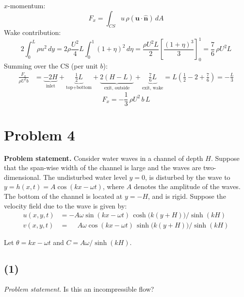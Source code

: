 \documentclass[11pt]{article}
\newcommand{\vect}[1]{\mathbf{#1}}
\begin{document}
\medskip
\noindent $x$-momentum:
\begin{equation*}
F_x = \int_{CS} u\,\rho(\vect u\cdot\hat{\vect n})\,dA
\end{equation*}
Wake contribution:
\begin{equation*}
2\int_0^L \rho u^2\,dy = 2\rho\frac{U^2}{4}L\int_0^1 (1+\eta)^2\,d\eta
= \frac{\rho U^2 L}{2}\left[\frac{(1+\eta)^3}{3}\right]_0^1 = \frac76\,\rho U^2 L
\end{equation*}
Summing over the CS (per unit $b$):
\begin{align*}
\frac{F_x}{\rho U^2 b} &= \underbrace{-2H}_{\text{inlet}} + \underbrace{\frac12 L}_{\text{top+bottom}}
 + \underbrace{2(H - L)}_{\text{exit, outside}} + \underbrace{\frac76 L}_{\text{exit, wake}}
 = L\left(\frac12 - 2 + \frac76\right) = -\frac{L}{3}
\end{align*}
\begin{equation*}
\boxed{F_x = -\frac13\,\rho U^2\,b\,L}
\end{equation*}

\section*{Problem 4}

\noindent\textbf{Problem statement.} Consider water waves in a channel of depth $H$. Suppose that the
span-wise width of the channel is large and the waves are two-dimensional. The undisturbed water
level $y = 0$, is disturbed by the wave to $y = h(x,t) = A\cos(kx - \omega t)$, where $A$ denotes the
amplitude of the waves. The bottom of the channel is located at $y = -H$, and is rigid. Suppose the
velocity field due to the wave is given by:
\begin{align*}
u(x,y,t) &= -A\omega\sin(kx-\omega t)\,\cosh\!\big(k(y+H)\big)/\sinh(kH) \\
v(x,y,t) &= \phantom{-}A\omega\cos(kx-\omega t)\,\sinh\!\big(k(y+H)\big)/\sinh(kH)
\end{align*}

\medskip
\noindent Let $\theta = kx - \omega t$ and $C = A\omega/\sinh(kH)$.

\subsection*{(1)}

\noindent\textit{Problem statement.} Is this an incompressible flow?
\end{document}
